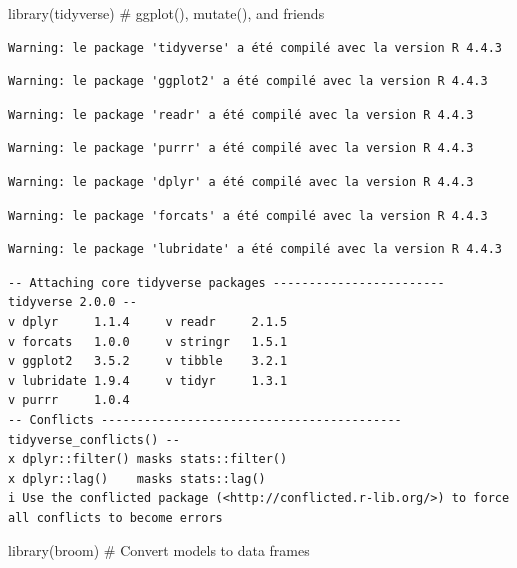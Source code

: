 \documentclass[
  letterpaper,
  DIV=11,
  numbers=noendperiod]{scrartcl}
\newenvironment{Shaded}{\begin{snugshade}}{\end{snugshade}}
\newcommand{\CommentTok}[1]{\textcolor[rgb]{0.37,0.37,0.37}{#1}}
\newcommand{\FunctionTok}[1]{\textcolor[rgb]{0.28,0.35,0.67}{#1}}
\newcommand{\NormalTok}[1]{\textcolor[rgb]{0.00,0.23,0.31}{#1}}
\begin{document}
\begin{Shaded}
\begin{Highlighting}[]
\FunctionTok{library}\NormalTok{(tidyverse)  }\CommentTok{\# ggplot(), mutate(), and friends}
\end{Highlighting}
\end{Shaded}

\begin{verbatim}
Warning: le package 'tidyverse' a été compilé avec la version R 4.4.3
\end{verbatim}

\begin{verbatim}
Warning: le package 'ggplot2' a été compilé avec la version R 4.4.3
\end{verbatim}

\begin{verbatim}
Warning: le package 'readr' a été compilé avec la version R 4.4.3
\end{verbatim}

\begin{verbatim}
Warning: le package 'purrr' a été compilé avec la version R 4.4.3
\end{verbatim}

\begin{verbatim}
Warning: le package 'dplyr' a été compilé avec la version R 4.4.3
\end{verbatim}

\begin{verbatim}
Warning: le package 'forcats' a été compilé avec la version R 4.4.3
\end{verbatim}

\begin{verbatim}
Warning: le package 'lubridate' a été compilé avec la version R 4.4.3
\end{verbatim}

\begin{verbatim}
-- Attaching core tidyverse packages ------------------------ tidyverse 2.0.0 --
v dplyr     1.1.4     v readr     2.1.5
v forcats   1.0.0     v stringr   1.5.1
v ggplot2   3.5.2     v tibble    3.2.1
v lubridate 1.9.4     v tidyr     1.3.1
v purrr     1.0.4     
-- Conflicts ------------------------------------------ tidyverse_conflicts() --
x dplyr::filter() masks stats::filter()
x dplyr::lag()    masks stats::lag()
i Use the conflicted package (<http://conflicted.r-lib.org/>) to force all conflicts to become errors
\end{verbatim}

\begin{Shaded}
\begin{Highlighting}[]
\FunctionTok{library}\NormalTok{(broom)  }\CommentTok{\# Convert models to data frames}
\end{Highlighting}
\end{Shaded}
\end{document}
